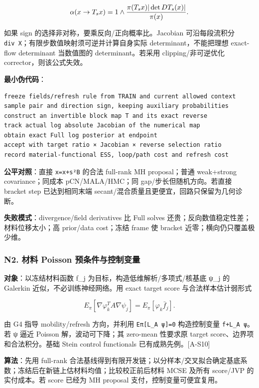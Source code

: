 \documentclass[
  11pt,
  a4paper,
]{article}
\begin{document}
\[
\alpha(x\to T_sx)=1\wedge {\pi(T_sx)|\det DT_s(x)|\over\pi(x)}.
\]

如果 sign 的选择非对称，要乘反向/正向概率比。Jacobian 可沿每段流积分
\texttt{div\ X}；有限步数值映射须可逆并计算自身实际
determinant，不能把理想 exact-flow determinant 当数值图的
determinant。若采用 clipping/非可逆优化 corrector，则该公式失效。

\textbf{最小伪代码}：

\begin{verbatim}
freeze fields/refresh rule from TRAIN and current allowed context
sample pair and direction sign, keeping auxiliary probabilities
construct an invertible block map T and its exact reverse
track actual log absolute Jacobian of the numerical map
obtain exact Full log posterior at endpoint
accept with target ratio × Jacobian × reverse selection ratio
record material-functional ESS, loop/path cost and refresh cost
\end{verbatim}

\textbf{公平对照}：直接 \texttt{x\textquotesingle{}=x+s²B} 的合法
full-rank MH proposal；普通 weak+strong covariance；同成本
pCN/MALA/HMC；同 gap/步长但随机方向。若直接 bracket step 已达到相同末端
secant/混合质量且更便宜，回路只保留为几何诊断。

\textbf{失败模式}：divergence/field derivatives 比 Full solves
还贵；反向数值稳定性差；材料位移太小；高 prior/data cost；冻结 frame 使
bracket 近零；横向仍只覆盖极少维。

\hypertarget{n2.-ux6750ux6599-poisson-ux9884ux6761ux4ef6ux4e0eux63a7ux5236ux53d8ux91cf}{%
\subsubsection{N2. 材料 Poisson
预条件与控制变量}\label{n2.-ux6750ux6599-poisson-ux9884ux6761ux4ef6ux4e0eux63a7ux5236ux53d8ux91cf}}

\textbf{对象}：以冻结材料函数 f\_\allowbreak{}j 为目标，构造低维解析/多项式/核基底
ψ\_\allowbreak{}j 的 Galerkin 近似，不必训练神经网络。用 exact target score
与合法样本估计弱形式

\[
E_\pi[\nabla\varphi_k^T A\nabla\psi_j]
 =E_\pi[\varphi_k\bar f_j].
\]

由 G4 指导 mobility/refresh 方向，并利用 \texttt{Eπ{[}L\_\allowbreak{}A\ ψ{]}=0}
构造控制变量 \texttt{f+L\_\allowbreak{}A\ ψ}。若 ψ 逼近 Poisson 解，波动可下降；其
zero-mean 性要求原 target score、边界项和合法积分。基础 Stein control
functionals 已有成熟先例。{[}A-S10{]}

\textbf{算法}：先用 full-rank
合法基线得到有限开发链；以分样本/交叉拟合确定基底系数；冻结后在新链上估材料均值；比较校正前后材料
MCSE 及所有 score/JVP 的实付成本。若 score 已经为 MH proposal
支付，控制变量可便宜复用。
\end{document}

